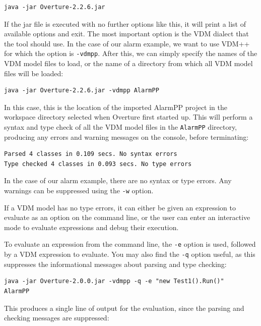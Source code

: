 \lstset{style=tool,language=}
\begin{lstlisting}
java -jar Overture-2.2.6.jar
\end{lstlisting}

\noindent If the jar file is executed with no further options like this, it will print a list of available options and exit. The most important option is the VDM dialect that the tool should use. In the case of our alarm example, we want to use VDM++ for which the option is \verb|-vdmpp|. After this, we can simply specify the names of the VDM model files to load, or the name of a directory from which all VDM model files will be loaded:

\begin{lstlisting}
java -jar Overture-2.2.6.jar -vdmpp AlarmPP
\end{lstlisting}

\noindent In this case, this is the location of the imported AlarmPP project in the workspace directory selected when Overture first started up.  This will perform a syntax and type check of all the VDM model files in the \verb|AlarmPP| directory, producing any errors and warning messages on the console, before terminating:

\begin{lstlisting}
Parsed 4 classes in 0.109 secs. No syntax errors
Type checked 4 classes in 0.093 secs. No type errors
\end{lstlisting}

\noindent In the case of our alarm example, there are no syntax or type errors. Any warnings can be suppressed using the \verb|-w| option.

If a VDM model has no type errors, it can either be given an expression to evaluate as an option on the command line, or the user can enter an interactive mode to evaluate expressions and debug their execution.

To evaluate an expression from the command line, the \verb|-e| option is used, followed by a VDM expression to evaluate. You may also find the \verb|-q| option useful, as this suppresses the informational messages about parsing and type checking:

\begin{lstlisting}
java -jar Overture-2.0.0.jar -vdmpp -q -e "new Test1().Run()"
AlarmPP
\end{lstlisting}

\noindent This produces a single line of output for the evaluation, since the parsing and checking messages are suppressed:

